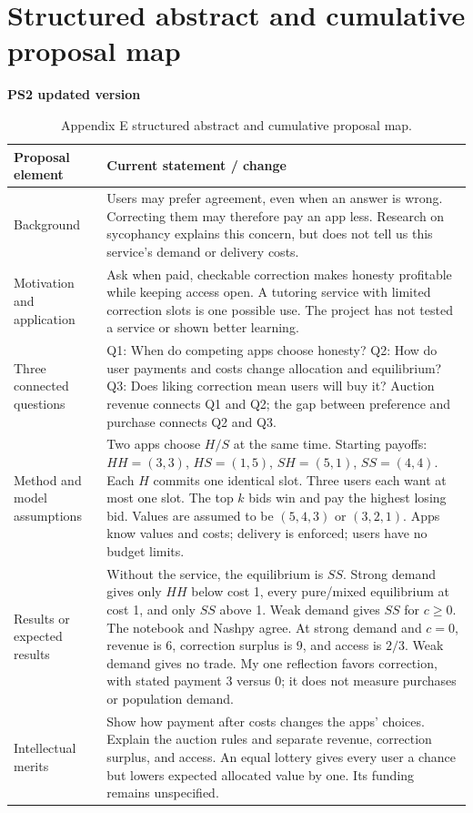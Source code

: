 \section{Structured abstract and cumulative proposal map}
\noindent\textbf{PS2 updated version}\par
\begin{table}[H]\caption{Appendix E structured abstract and cumulative proposal map.}
\renewcommand{\arraystretch}{1.18}\begin{tabularx}{\textwidth}{@{}p{}Y@{}}
\toprule \textbf{Proposal element} & \textbf{Current statement / change}\\\midrule
Background & Users may prefer agreement, even when an answer is wrong. Correcting them may therefore pay an app less. Research on sycophancy explains this concern, but does not tell us this service's demand or delivery costs.\\
Motivation and application & Ask when paid, checkable correction makes honesty profitable while keeping access open. A tutoring service with limited correction slots is one possible use. The project has not tested a service or shown better learning.\\
Three connected questions & Q1: When do competing apps choose honesty? Q2: How do user payments and costs change allocation and equilibrium? Q3: Does liking correction mean users will buy it? Auction revenue connects Q1 and Q2; the gap between preference and purchase connects Q2 and Q3.\\
Method and model assumptions & Two apps choose $H/S$ at the same time. Starting payoffs: $HH=(3,3)$, $HS=(1,5)$, $SH=(5,1)$, $SS=(4,4)$. Each $H$ commits one identical slot. Three users each want at most one slot. The top $k$ bids win and pay the highest losing bid. Values are assumed to be $(5,4,3)$ or $(3,2,1)$. Apps know values and costs; delivery is enforced; users have no budget limits.\\
Results or expected results & Without the service, the equilibrium is $SS$. Strong demand gives only $HH$ below cost 1, every pure/mixed equilibrium at cost 1, and only $SS$ above 1. Weak demand gives $SS$ for $c\geq0$. The notebook and Nashpy agree. At strong demand and $c=0$, revenue is 6, correction surplus is 9, and access is $2/3$. Weak demand gives no trade. My one reflection favors correction, with stated payment 3 versus 0; it does not measure purchases or population demand.\\
Intellectual merits & Show how payment after costs changes the apps' choices. Explain the auction rules and separate revenue, correction surplus, and access. An equal lottery gives every user a chance but lowers expected allocated value by one. Its funding remains unspecified.\\

\end{tabularx}
\end{table}

